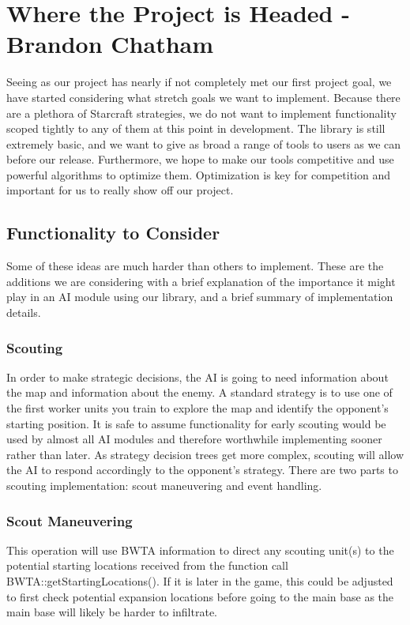 \documentclass[10pt,letterpaper,onecolumn,draftclsnofoot]{IEEEtran}
\begin{document}
	\section{Where the Project is Headed - Brandon Chatham}
	Seeing as our project has nearly if not completely met our first project goal, we have started considering what stretch goals we want to implement. Because there are a plethora of Starcraft strategies, we do not want to implement functionality scoped tightly to any of them at this point in development. The library is still extremely basic, and we want to give as broad a range of tools to users as we can before our release. Furthermore, we hope to make our tools competitive and use powerful algorithms to optimize them. Optimization is key for competition and important for us to really show off our project.
	\subsection{Functionality to Consider}
	Some of these ideas are much harder than others to implement. These are the additions we are considering with a brief explanation of the importance it might play in an AI module using our library, and a brief summary of implementation details.
	\subsubsection{Scouting}
	In order to make strategic decisions, the AI is going to need information about the map and information about the enemy. A standard strategy is to use one of the first worker units you train to explore the map and identify the opponent's starting position. It is safe to assume functionality for early scouting would be used by almost all AI modules and therefore worthwhile implementing sooner rather than later. As strategy decision trees get more complex, scouting will allow the AI to respond accordingly to the opponent's strategy. There are two parts to scouting implementation: scout maneuvering and event handling.
	\subsubsection{Scout Maneuvering}
	This operation will use BWTA information to direct any scouting unit(s) to the potential starting locations received from the function call BWTA::getStartingLocations(). If it is later in the game, this could be adjusted to first check potential expansion locations before going to the main base as the main base will likely be harder to infiltrate. 
\end{document}
